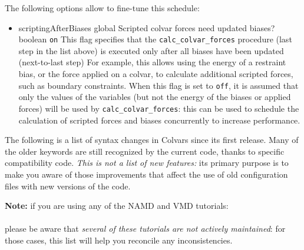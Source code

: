 {The following options allow to fine-tune this schedule:
\begin{itemize}
\item %
  \keydef
    {scriptingAfterBiases}{%
    global}{%
    Scripted colvar forces need updated biases?}{%
    boolean}{%
    \texttt{on}}{%
    This flag specifies that the \texttt{calc\_colvar\_forces} procedure (last step in the list above) is executed only after all biases have been updated (next-to-last step)
    For example, this allows using the energy of a restraint bias, or the force applied on a colvar,
    to calculate additional scripted forces, such as boundary constraints.
    When this flag is set to \texttt{off}, it is assumed that only the values of the variables
    (but not the energy of the biases or applied forces) will be used by \texttt{calc\_colvar\_forces}:
    this can be used to schedule the calculation of scripted forces and biases concurrently
    to increase performance.}
\end{itemize}

}





The following is a list of syntax changes in Colvars since its first release.
Many of the older keywords are still recognized by the current code, thanks to specific compatibility code.
\emph{This is not a list of new features:} its primary purpose is to make you aware of those improvements that affect the use of old configuration files with new versions of the code.

\noindent\textbf{Note:} if you are using any of the NAMD and VMD tutorials:\\
\\
please be aware that \emph{several of these tutorials are not actively maintained}: for those cases, this list will help you reconcile any inconsistencies.

